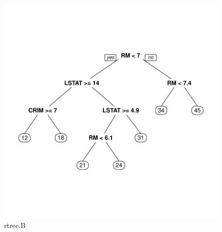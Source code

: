 \documentclass{article}
\begin{document}
\begin{figure}
\begin{center}
\includegraphics{Assignment4a-007}
\end{center}
\caption{rtree.B}
\label{rtree:B}
\end{figure}
\end{document}
